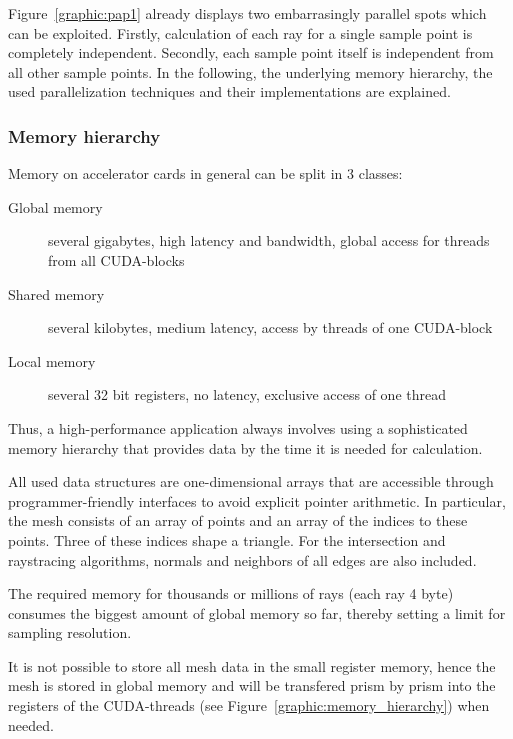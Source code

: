 Figure~\ref{graphic:pap1} already displays two embarrasingly parallel spots
which can be exploited. Firstly, calculation of each ray for a single sample
point is completely independent. Secondly, each sample point itself is
independent from all other sample points. 
In the following, the underlying memory hierarchy, the used parallelization
techniques and their implementations are explained.

\subsubsection{Memory hierarchy}
Memory on accelerator cards in general can be split
in 3 classes: 
\begin{description}
  \item[Global memory] several gigabytes, high latency and bandwidth, global access for threads from all CUDA-blocks
  \item[Shared memory] several kilobytes, medium latency, access by threads of one CUDA-block
  \item[Local memory] several 32 bit registers, no latency, exclusive access of one thread
\end{description}
Thus, a high-performance application always involves using
a sophisticated memory hierarchy that provides data by
the time it is needed for calculation.

All used data structures are one-dimensional 
arrays that are accessible through programmer-friendly interfaces to avoid
explicit pointer arithmetic.
In particular, the mesh consists of an array of points and an array of the indices
to these points. Three of these indices shape a triangle.
For the intersection and raystracing algorithms, normals and neighbors
of all edges are also included. 

The required memory for thousands or millions of rays (each ray 4 byte)
consumes the biggest amount of global memory so far, thereby setting 
a limit for sampling resolution. 

It is not possible to store all mesh data in the small register
memory, hence the mesh is stored in global memory and will
be transfered prism by prism into the registers of the
CUDA-threads (see Figure~\ref{graphic:memory_hierarchy}) when needed.

